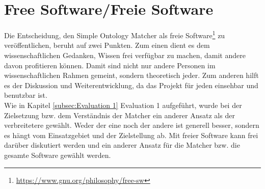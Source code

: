 \section{Free Software/Freie Software}
Die Entscheidung, den Simple Ontology Matcher als freie
Software\footnote{\url{https://www.gnu.org/philosophy/free-sw}} zu veröffentlichen, beruht auf zwei Punkten. Zum einen dient es dem
wissenschaftlichen Gedanken, Wissen frei verfügbar zu machen, damit andere davon
profitieren können. Damit sind nicht nur andere Personen im wissenschaftlichen
Rahmen gemeint, sondern theoretisch jeder. Zum anderen hilft es der Diskussion
und Weiterentwicklung, da das Projekt für jeden einsehbar und benutzbar ist.\\
Wie in Kapitel \ref{subsec:Evaluation 1} Evaluation 1 aufgeführt, wurde bei der
Zielsetzung bzw. dem Verständnis der Matcher ein anderer Ansatz als der
verbreitetere gewählt. Weder der eine noch der andere ist generell besser,
sondern es hängt vom Einsatzgebiet und der Zielstellung ab. Mit freier Software
kann frei darüber diskutiert werden und ein anderer Ansatz für die Matcher bzw.
die gesamte Software gewählt werden.

\cleardoublepage
\pagebreak[4]